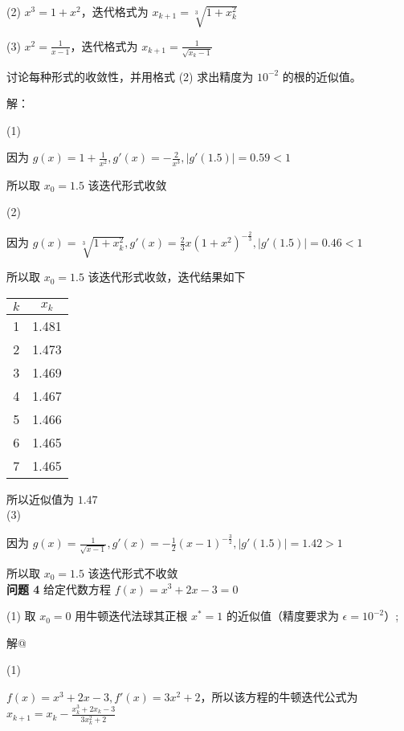 \documentclass{article}
\begin{document}
(2) $x^3 = 1 + x^2$，迭代格式为 $x_{k + 1} = \sqrt[3]{1 + x_k^2}$

(3) $x^2 = \frac{1}{x - 1}$，迭代格式为 $x_{k + 1} = \frac{1}{\sqrt{x_k - 1}}$

讨论每种形式的收敛性，并用格式 (2) 求出精度为 $10^{-2}$ 的根的近似值。


\noindent 解：

\noindent (1) 

因为 $g(x) = 1 + \frac{1}{x^2}, g'(x) = -\frac{2}{x^3}, |g'(1.5)| = 0.59 < 1$

所以取 $x_0 = 1.5$ 该迭代形式收敛

\noindent (2)

因为 $g(x) = \sqrt[3]{1 + x_k^2}, g'(x) = \frac{2}{3}x(1 + x^2)^{-\frac{2}{3}}, |g'(1.5)| = 0.46 < 1$

所以取 $x_0 = 1.5$ 该迭代形式收敛，迭代结果如下

\begin{center}
\begin{tabular}{|c|c|}
    \hline
    $k$ & $x_k$ \\
    \hline
    1 & 1.481 \\
    2 & 1.473 \\
    3 & 1.469 \\
    4 & 1.467 \\
    5 & 1.466 \\
    6 & 1.465 \\
    7 & 1.465 \\
    \hline
\end{tabular}
\end{center}

所以近似值为 $1.47$ \\

\noindent (3)

因为 $g(x) = \frac{1}{\sqrt{x - 1}}, g'(x) = -\frac{1}{2}(x - 1)^{-\frac{3}{2}}, |g'(1.5)| = 1.42 > 1$

所以取 $x_0 = 1.5$ 该迭代形式不收敛 \\

\noindent\textbf{问题 4} 给定代数方程 $f(x) = x^3 + 2x - 3 = 0$

(1) 取 $x_0 = 0$ 用牛顿迭代法球其正根 $x^* = 1$ 的近似值（精度要求为 $\epsilon=10^{-2}$）;

\noindent 解@

\noindent (1)

$f(x) = x^3 + 2x - 3, f'(x) = 3x^2 + 2$，所以该方程的牛顿迭代公式为 $x_{k + 1} = x_k - \frac{x_k^3 + 2x_k - 3}{3x_k^2 + 2}$
\end{document}
